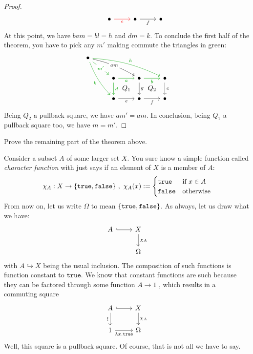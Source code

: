 \begin{proof}
\[\begin{tikzcd}
      & \bullet \ar["e", r, swap, red] & \bullet \ar["f", r, swap] & \bullet
    \end{tikzcd}\] At this point, we have \(b a m = b l = h\) and
  \(dm = k\). To conclude the first half of the theorem, you have to
  pick any \(m'\) making commute the triangles in green:
  \[\begin{tikzcd}
      \bullet \ar["h", bend left=10, drrr, green!65!black] \ar["k", bend right=10, ddr, swap, green!65!black] \ar["am" description, drr, bend left=8] \ar["{m'}" description, dr, green!65!black] & & & \\
      & \bullet \ar["a", r, swap, green!65!black] \ar["d", d, green!65!black] \ar["{Q_1}", dr, phantom] & \bullet \ar["b", r, swap, green!65!black] \ar["g", d] \ar["{Q_2}", dr, phantom] & \bullet \ar["c", d]\\
      & \bullet \ar["e", r, swap] & \bullet \ar["f", r, swap] & \bullet
    \end{tikzcd}\] Being \(Q_2\) a pullback square, we have
  \(am' = am\). In conclusion, being \(Q_1\) a pullback square too, we
  have \(m = m'\). 
\end{proof}

\begin{exercise}
  Prove the remaining part of the theorem above.
\end{exercise}

\begin{example}
  Consider a subset \(A\) of some larger set \(X\). You sure know a
  simple function called {\em character function} with just says if an
  element of \(X\) is a member of \(A\):
  \[\chi_A : X \to \left\{\mathtt{true}, \mathtt{false}\right\}\,,\ \chi_A (x)
    := \begin{cases} \mathtt{true} & \text{if } x \in A \\
      \mathtt{false} & \text{otherwise} \end{cases}\] From now on, let
  us write \(\Omega\) to mean \(\left\{\mathtt{true}, \mathtt{false}\right\}\). As
  always, let us draw what we have:
  \[\begin{tikzcd}
      A \ar[r, hookrightarrow] & X \ar["{\chi_A}", d] \\
      & \Omega
    \end{tikzcd}\] with \(A \hookrightarrow X\) being the usual inclusion. The
  composition of such functions is function constant to
  \(\mathtt{true}\). We know that constant functions are such because
  they can be factored through some function \(A \to 1\)
  , which results
  in a commuting square
  \[\begin{tikzcd}
      A \ar[r, hookrightarrow] \ar["!", d, swap] & X \ar["{\chi_A}", d] \\
      1 \ar["{\lambda x. \mathtt{true}}", r, swap] & \Omega
    \end{tikzcd}\] Well, this square is a pullback square. Of course,
  that is not all we have to say. 
\end{example}

